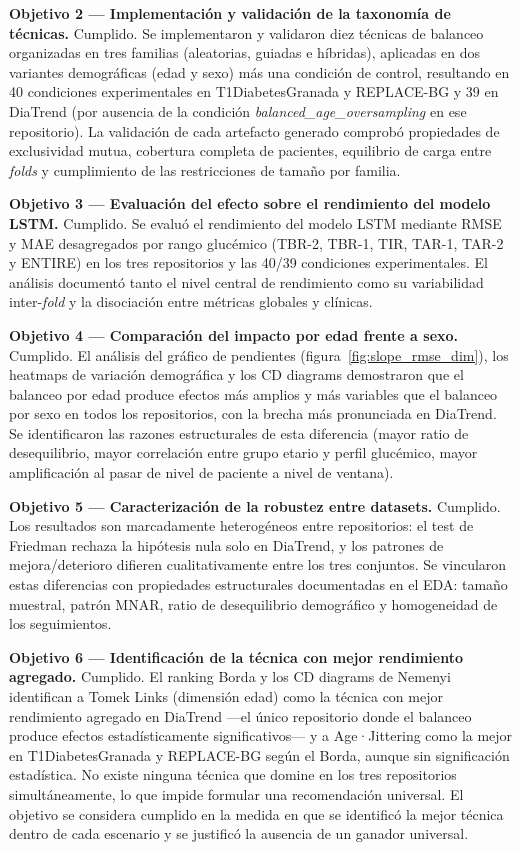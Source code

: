 \textbf{Objetivo 2 — Implementación y validación de la taxonomía de
técnicas.} Cumplido. Se implementaron y validaron diez técnicas de
balanceo organizadas en tres familias (aleatorias, guiadas e híbridas),
aplicadas en dos variantes demográficas (edad y sexo) más una condición
de control, resultando en 40 condiciones experimentales en
T1DiabetesGranada y REPLACE-BG y 39 en DiaTrend (por ausencia de la
condición \textit{balanced\_age\_oversampling} en ese repositorio). La
validación de cada artefacto generado comprobó propiedades de
exclusividad mutua, cobertura completa de pacientes, equilibrio de carga
entre \textit{folds} y cumplimiento de las restricciones de tamaño por
familia.

\textbf{Objetivo 3 — Evaluación del efecto sobre el rendimiento del
modelo LSTM.} Cumplido. Se evaluó el rendimiento del modelo LSTM mediante
RMSE y MAE desagregados por rango glucémico (TBR-2, TBR-1, TIR, TAR-1,
TAR-2 y ENTIRE) en los tres repositorios y las 40/39 condiciones
experimentales. El análisis documentó tanto el nivel central de rendimiento
como su variabilidad inter-\textit{fold} y la disociación entre métricas
globales y clínicas.

\textbf{Objetivo 4 — Comparación del impacto por edad frente a sexo.}
Cumplido. El análisis del gráfico de pendientes
(figura~\ref{fig:slope_rmse_dim}), los heatmaps de variación demográfica
y los CD diagrams demostraron que el balanceo por edad produce efectos
más amplios y más variables que el balanceo por sexo en todos los
repositorios, con la brecha más pronunciada en DiaTrend. Se identificaron
las razones estructurales de esta diferencia (mayor ratio de desequilibrio,
mayor correlación entre grupo etario y perfil glucémico, mayor
amplificación al pasar de nivel de paciente a nivel de ventana).

\textbf{Objetivo 5 — Caracterización de la robustez entre datasets.}
Cumplido. Los resultados son marcadamente heterogéneos entre repositorios:
el test de Friedman rechaza la hipótesis nula solo en DiaTrend, y los
patrones de mejora/deterioro difieren cualitativamente entre los tres
conjuntos. Se vincularon estas diferencias con propiedades estructurales
documentadas en el EDA: tamaño muestral, patrón MNAR, ratio de
desequilibrio demográfico y homogeneidad de los seguimientos.

\textbf{Objetivo 6 — Identificación de la técnica con mejor rendimiento
agregado.} Cumplido. El ranking Borda y los CD diagrams
de Nemenyi identifican a Tomek Links (dimensión edad) como la técnica
con mejor rendimiento agregado en DiaTrend ---el único repositorio donde
el balanceo produce efectos estadísticamente significativos--- y a
Age·Jittering como la mejor en T1DiabetesGranada y REPLACE-BG según el
Borda, aunque sin significación estadística. No existe ninguna técnica
que domine en los tres repositorios simultáneamente, lo que impide
formular una recomendación universal. El objetivo se considera cumplido
en la medida en que se identificó la mejor técnica dentro de cada
escenario y se justificó la ausencia de un ganador universal.

